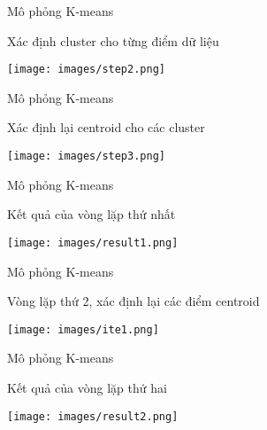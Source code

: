 \documentclass[english,10pt,table]{beamer}
\begin{document}
\begin{frame} {Mô phỏng K-means}
\begin{block}{Xác định cluster cho từng điểm dữ liệu}
	\begin{center}
		\texttt{[image: images/step2.png]}
	\end{center}
\end{block}
\end{frame}

\begin{frame} {Mô phỏng K-means}
\begin{block}{Xác định lại centroid cho các cluster}
	\begin{center}
		\texttt{[image: images/step3.png]}
	\end{center}
\end{block}
\end{frame}

\begin{frame} {Mô phỏng K-means}
\begin{block}{Kết quả của vòng lặp thứ nhất}
	\begin{center}
		\texttt{[image: images/result1.png]}
	\end{center}
\end{block}
\end{frame}

\begin{frame} {Mô phỏng K-means}
\begin{block}{Vòng lặp thứ 2, xác định lại các điểm centroid}
	\begin{center}
		\texttt{[image: images/ite1.png]}
	\end{center}
\end{block}
\end{frame}

\begin{frame} {Mô phỏng K-means}
\begin{block}{Kết quả của vòng lặp thứ hai}
	\begin{center}
		\texttt{[image: images/result2.png]}
	\end{center}
\end{block}
\end{frame}

\end{document}
